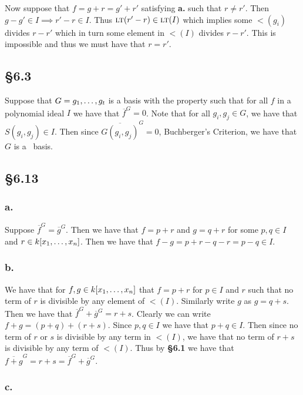 \documentclass[letterpaper]{article}
\begin{document}
Now suppose that $f = g + r = g' + r'$ satisfying \textbf{a.} such that $r \neq r'$.
Then $g - g' \in I \implies r' - r \in I$.
Thus $\lt(r' - r) \in \gen{\lt(I)}$ which implies some $\lt(g_{i})$ divides $r - r'$ which in turn some element in $\lt(I)$ divides $r - r'$.
This is impossible and thus we must have that $r = r'$.

\subsection*{\S 6.3}

Suppose that $G = \gen{g_{1}, \ldots, g_{t}}$ is a basis with the property such that for all $f$ in a polynomial ideal $I$ we have that $\overline{f}^{G} = 0$.
Note that for all $g_{i}, g_{j} \in G$, we have that $S(g_{i}, g_{j}) \in I$.
Then since $\overline{G(g_{i}, g_{j})}^{G} = 0$, Buchberger's Criterion, we have that $G$ is a \Grobner\ basis.

\subsection*{\S 6.13}

\subsubsection*{a.}

Suppose $\overline{f}^{G} = \overline{g}^{G}$.
Then we have that $f = p + r$ and $g = q + r$ for some $p, q \in I$ and $r \in k\bqty{x_{1}, \ldots, x_{n}}$.
Then we have that $f - g = p + r - q - r = p - q \in I$.

\subsubsection*{b.}

We have that for $f, g \in k\bqty{x_{1}, \ldots, x_{n}}$ that $f = p + r$ for $p \in I$ and $r$ such that no term of $r$ is divisible by any element of $\lt(I)$.
Similarly write $g$ as $g = q + s$.
Then we have that $\overline{f}^{G} + \overline{g}^{G} = r + s$.
Clearly we can write $f + g = (p + q) + (r + s)$.
Since $p, q \in I$ we have that $p + q \in I$.
Then since no term of $r$ or $s$ is divisible by any term in $\lt(I)$, we have that no term of $r + s$ is divisible by any term of $\lt(I)$.
Thus by \textbf{\S 6.1} we have that $\overline{f + g}^{G} = r + s = \overline{f}^{G} + \overline{g}^{G}$.

\subsubsection*{c.}
\end{document}
